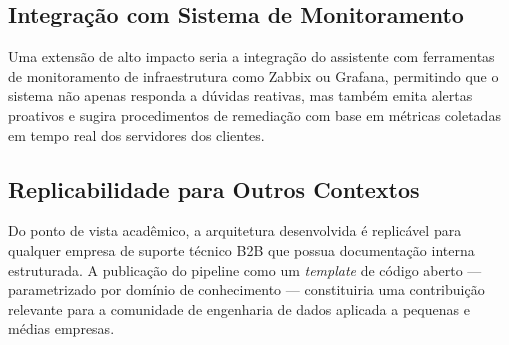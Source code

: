 \documentclass[a4paper,12pt,Times]{article}
\begin{document}
\subsection{Integração com Sistema de Monitoramento}

Uma extensão de alto impacto seria a integração do assistente com ferramentas de
monitoramento de infraestrutura como Zabbix ou Grafana, permitindo que o sistema não apenas
responda a dúvidas reativas, mas também emita alertas proativos e sugira procedimentos de
remediação com base em métricas coletadas em tempo real dos servidores dos clientes.

\subsection{Replicabilidade para Outros Contextos}

Do ponto de vista acadêmico, a arquitetura desenvolvida é replicável para qualquer empresa
de suporte técnico B2B que possua documentação interna estruturada. A publicação do
pipeline como um \textit{template} de código aberto — parametrizado por domínio de
conhecimento — constituiria uma contribuição relevante para a comunidade de engenharia de
dados aplicada a pequenas e médias empresas.
\end{document}
